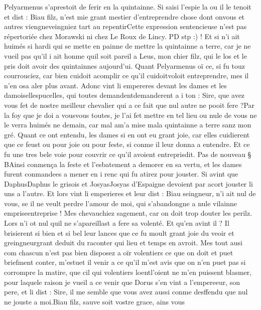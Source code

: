 \documentclass{article}
\begin{document}
\begin{pages}
   Pelyarmenus s’aprestoit de ferir en la quintainne. Si saisi l’espie la ou il le tenoit et dist :
   Biau filz, n’est mie grant mestier d’entreprendre chose dont 
      onvous et autres 
      viengneveingniez tart au repentirCette 
      expression sentencieuse n'est pas répertoriée chez Morawski ni chez Le Roux de Lincy. PD stp :) ! Et si n’i ait huimés si hardi qui se
      mette en painne de mettre 
      la quintainne a terre, car je ne vueil pas qu’il i ait honme quil soit pareil a Leus,
      mon chier filz, qui le los et le pris doit avoir des quintainnes aujourd’ui. \pend
\pstart Quant Pelyarmenus oï ce, si fu touz courrouciez, 
   car bien cuidoit acomplir ce qu’il cuidoitvoloit entreprendre, mes il n’en osa 
   aler plus avant. Adonc vint li empereres devant les dames et les 
   damoisellespucelles, qui toutes 
   demandentdemanderent a i ton :
   Sire, que avez vous fet de nostre meilleur chevalier qui a ce fait que nul autre ne pooit fere ?Par la foy que je doi a vousvous toutes, 
      je l’ai fet mettre en tel lieu ou nule de vous ne le verra huimés ne demain, car mal 
      am'a mise mala 
      quintainne a terre sanz mon gré.
   Quant ce ont entendu, les dames si en ont eu grant joie, car elles cuidierent que ce feust ou pour joie ou pour feste, 
   si conme il leur donna a entendre. Et ce fu une tres bele voie pour couvrir ce qu’il avoient 
   entreprisdit. \pend
\pstart Pas de nouveau § BAinsi conmença la feste et l’esbatement a demorer en sa vertu, et les dames furent conmandees a mener en 
   i renc qui fu atirez pour jouster. Si avint que 
   DaphusDaphus le grisois 
   et JosyasJosyas d'Espaigne 
   devoient par acort jouster li uns a l’autre. Et lors vint li emperieres et leur dist :
   Biau seingneur, n’i ait nul de vous, se il ne veult perdre l’amour de moi,
      qui s’abandongne a nule vilainne empriseentreprise ! 
      Mes chevauchiez sagement, car on doit trop douter les perilz.
   Lors n’i ot nul quil ne s’apareillast a fere sa volenté. Et qu’en avint il ? 
   Il brisierent si bien et si bel 
   leur lances que ce fu moult grant joie du veoir et
   greingneurgrant deduit du raconter qui lieu et temps en avroit. 
   Mes tout ausi com chascun n’est pas bien disposez a oïr volentiers ce que on doit et puet briefment conter, 
   m’estuet il venir a ce qu’il m’est avis que on n’en puet pas si corrompre la matire,
   que cil qui volentiers loentl'oient ne m’en puissent blasmer, 
   pour laquele raison je vueil a ce venir que 
   Dorus s’en vint a l’empereeur, son pere, et li dist :
   Sire, il me semble que vous avez aussi conme desffendu que nul ne jouste a moi.Biau filz, sauve soit vostre grace, ains vous 

\end{pages}
\end{document}
